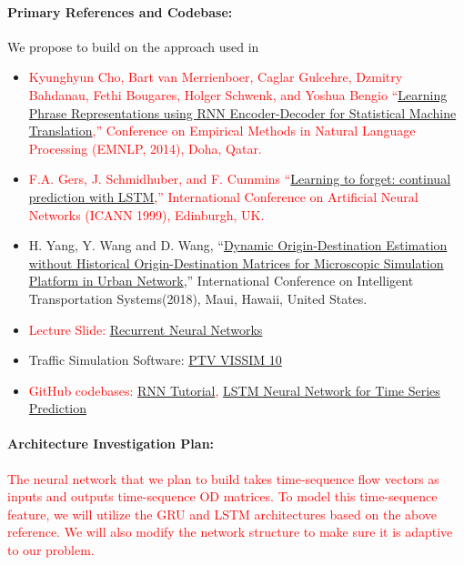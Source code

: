 \documentclass[11pt]{article}
\begin{document}
\paragraph{Primary References and Codebase:}  We propose to build on the approach used in 

\begin{itemize} 
\item \textcolor{red}{Kyunghyun Cho, Bart van Merrienboer, Caglar Gulcehre, Dzmitry Bahdanau, Fethi Bougares, Holger Schwenk, and Yoshua Bengio ``\href{https://arxiv.org/pdf/1406.1078.pdf}{Learning Phrase Representations using RNN Encoder-Decoder for Statistical Machine Translation},'' Conference on Empirical Methods in Natural Language Processing (EMNLP, 2014), Doha, Qatar.}
\item \textcolor{red}{F.A. Gers, J. Schmidhuber, and F. Cummins ``\href{https://ieeexplore.ieee.org/document/818041}{Learning to forget: continual prediction with LSTM},'' International Conference on Artificial Neural Networks (ICANN 1999), Edinburgh, UK.}
\item H. Yang, Y. Wang and D. Wang, ``\href{https://www.researchgate.net/publication/329615627_Dynamic_Origin-Destination_Estimation_without_Historical_Origin-Destination_Matrices_for_Microscopic_Simulation_Platform_in_Urban_Network}{Dynamic Origin-Destination Estimation without Historical Origin-Destination Matrices for Microscopic Simulation Platform in Urban Network},'' International Conference on Intelligent Transportation Systems(2018), Maui, Hawaii, United States.  
\item \textcolor{red}{Lecture Slide: \href{https://d1b10bmlvqabco.cloudfront.net/attach/jqbjkm8k8bd3as/hlh7h4p8zmb5sa/jtywp2zthbge/RNNs.pdf}{Recurrent Neural Networks}}
\item Traffic Simulation Software: \href{http://vision-traffic.ptvgroup.com/en-us/products/ptv-vissim/}{PTV VISSIM 10}
\item \textcolor{red}{GitHub codebases: \href{https://github.com/dennybritz/rnn-tutorial-gru-lstm} {RNN Tutorial}, 
\href{https://github.com/jaungiers/LSTM-Neural-Network-for-Time-Series-Prediction}{LSTM Neural Network for Time Series Prediction}}
\end{itemize} 


\paragraph{Architecture Investigation Plan:} \textcolor{red}{The neural network that we plan to build takes time-sequence flow vectors as inputs and outputs time-sequence OD matrices. To model this time-sequence feature, we will utilize the GRU and LSTM architectures based on the above reference. We will also modify the network structure to make sure it is adaptive to our problem.}
\end{document}
